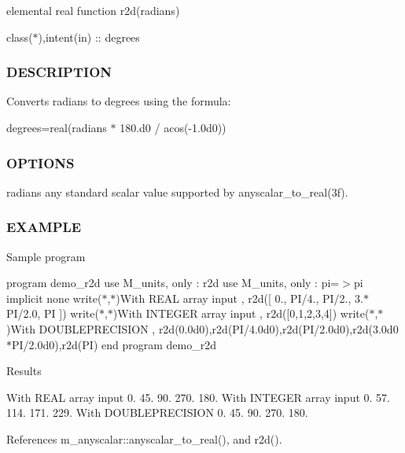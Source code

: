 elemental real function r2d(radians)

class($\ast$),intent(in) \+:\+: degrees \subsubsection*{D\+E\+S\+C\+R\+I\+P\+T\+I\+ON}

Converts radians to degrees using the formula\+:

degrees=real(radians $\ast$ 180.\+d0 / acos(-\/1.\+0d0)) \subsubsection*{O\+P\+T\+I\+O\+NS}

radians any standard scalar value supported by anyscalar\+\_\+to\+\_\+real(3f). \subsubsection*{E\+X\+A\+M\+P\+LE}

Sample program

program demo\+\_\+r2d use M\+\_\+units, only \+: r2d use M\+\_\+units, only \+: pi=$>$pi implicit none write($\ast$,$\ast$)\textquotesingle{}With R\+E\+AL array input \textquotesingle{}, r2d(\mbox{[} 0., P\+I/4., P\+I/2., 3.$\ast$\+P\+I/2.0, PI \mbox{]}) write($\ast$,$\ast$)\textquotesingle{}With I\+N\+T\+E\+G\+ER array input \textquotesingle{}, r2d(\mbox{[}0,1,2,3,4\mbox{]}) write($\ast$,$\ast$)\textquotesingle{}With D\+O\+U\+B\+L\+E\+P\+R\+E\+C\+I\+S\+I\+ON \textquotesingle{}, r2d(0.\+0d0),r2d(P\+I/4.\+0d0),r2d(P\+I/2.\+0d0),r2d(3.\+0d0$\ast$\+P\+I/2.0d0),r2d(\+P\+I) end program demo\+\_\+r2d

Results

With R\+E\+AL array input 0. 45. 90. 270. 180. With I\+N\+T\+E\+G\+ER array input 0. 57. 114. 171. 229. With D\+O\+U\+B\+L\+E\+P\+R\+E\+C\+I\+S\+I\+ON 0. 45. 90. 270. 180. 

References m\+\_\+anyscalar\+::anyscalar\+\_\+to\+\_\+real(), and r2d().

